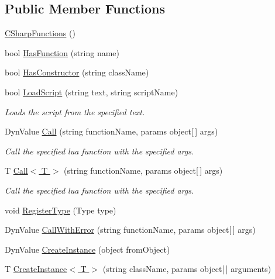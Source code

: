 \subsection*{Public Member Functions}
\begin{DoxyCompactItemize}
\item 
\hyperlink{class_c_sharp_functions_aad8975e1b2fb708a34d1fc048ff8baf9}{C\+Sharp\+Functions} ()
\item 
bool \hyperlink{class_c_sharp_functions_ac272ce8ef722b90c5c9c95c93527f85a}{Has\+Function} (string name)
\item 
bool \hyperlink{class_c_sharp_functions_a803d561b3e19f9b6420d4afcf5e4c631}{Has\+Constructor} (string class\+Name)
\item 
bool \hyperlink{class_c_sharp_functions_a547a7d8ed518aa7395920c07ad59d0f4}{Load\+Script} (string text, string script\+Name)
\begin{DoxyCompactList}\small\item\em Loads the script from the specified text. \end{DoxyCompactList}\item 
Dyn\+Value \hyperlink{class_c_sharp_functions_a6c500d1a443f10a60c96819583cc3168}{Call} (string function\+Name, params object\mbox{[}$\,$\mbox{]} args)
\begin{DoxyCompactList}\small\item\em Call the specified lua function with the specified args. \end{DoxyCompactList}\item 
T \hyperlink{class_c_sharp_functions_aaa94615d2df3daab6e2d22a4b257d2e0}{Call$<$ T $>$} (string function\+Name, params object\mbox{[}$\,$\mbox{]} args)
\begin{DoxyCompactList}\small\item\em Call the specified lua function with the specified args. \end{DoxyCompactList}\item 
void \hyperlink{class_c_sharp_functions_aaff47aec44f8092d6686bfe8f1dd0647}{Register\+Type} (Type type)
\item 
Dyn\+Value \hyperlink{class_c_sharp_functions_a734f7a4d7c779388343d55e42de203c2}{Call\+With\+Error} (string function\+Name, params object\mbox{[}$\,$\mbox{]} args)
\item 
Dyn\+Value \hyperlink{class_c_sharp_functions_ae2a8accaa0f465b627997d145452ec19}{Create\+Instance} (object from\+Object)
\item 
T \hyperlink{class_c_sharp_functions_a9571709a7b9247f42ebf27cac0286751}{Create\+Instance$<$ T $>$} (string class\+Name, params object\mbox{[}$\,$\mbox{]} arguments)
\end{DoxyCompactItemize}
